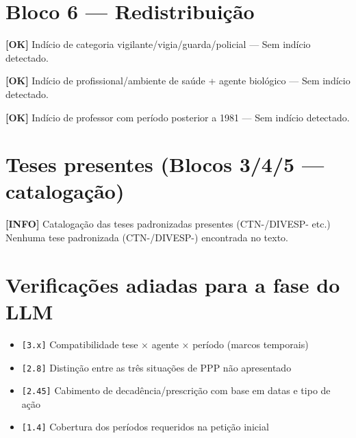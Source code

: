 \documentclass[12pt,a4paper]{article}
\newcommand{\statusOK}[1]{\textcolor{corOK}{\textbf{[OK]}} #1}
\newcommand{\statusINFO}[1]{\textcolor{corINFO}{\textbf{[INFO]}} #1}
\begin{document}
\section{Bloco 6 --- Redistribuição}

\statusOK{Indício de categoria vigilante/vigia/guarda/policial} --- Sem indício detectado.

\medskip
\statusOK{Indício de profissional/ambiente de saúde + agente biológico} --- Sem indício detectado.

\medskip
\statusOK{Indício de professor com período posterior a 1981} --- Sem indício detectado.

\section{Teses presentes (Blocos 3/4/5 --- catalogação)}

\statusINFO{Catalogação das teses padronizadas presentes (CTN-/DIVESP- etc.)}\\
Nenhuma tese padronizada (CTN-/DIVESP-) encontrada no texto.

\section{Verificações adiadas para a fase do LLM}

\begin{itemize}
  \item \texttt{[3.x]} Compatibilidade tese × agente × período (marcos temporais)
  \item \texttt{[2.8]} Distinção entre as três situações de PPP não apresentado
  \item \texttt{[2.45]} Cabimento de decadência/prescrição com base em datas e tipo de ação
  \item \texttt{[1.4]} Cobertura dos períodos requeridos na petição inicial
\end{itemize}
\end{document}
